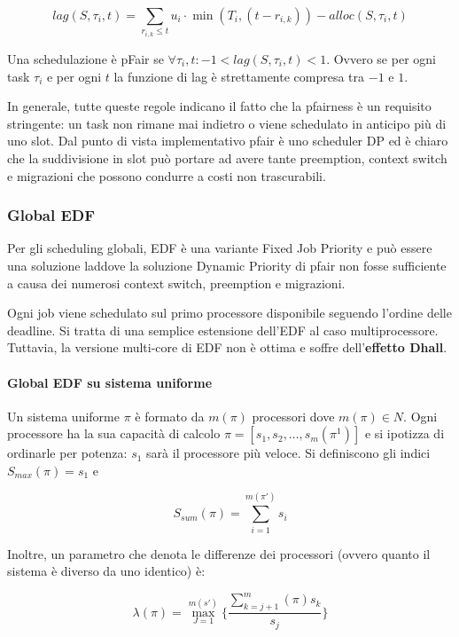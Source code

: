 \documentclass[11pt,a4paper]{report}
\begin{document}
\[ lag(S, \tau_i, t) = \sum_{r_{i,k} \le t} u_i \cdot \min(T_i, (t - r_{i,k})) - alloc(S, \tau_i, t) \]

Una schedulazione è pFair se $\forall \tau_i, t: -1 < lag(S, \tau_i, t) < 1$. Ovvero se per ogni task $\tau_i$ e per ogni $t$ la funzione di lag è strettamente compresa tra $-1$ e $1$.

In generale, tutte queste regole indicano il fatto che la pfairness è un requisito stringente: un task non rimane mai indietro o viene schedulato in anticipo più di uno slot.
Dal punto di vista implementativo pfair è uno scheduler DP ed è chiaro che la suddivisione in slot può portare ad avere tante preemption, context switch e migrazioni che possono condurre a costi non trascurabili.

\subsubsection{Global EDF}
Per gli scheduling globali, EDF è una variante Fixed Job Priority e può essere una soluzione laddove la soluzione Dynamic Priority di pfair non fosse sufficiente a causa dei numerosi context switch, preemption e migrazioni.

Ogni job viene schedulato sul primo processore disponibile seguendo l'ordine delle deadline. Si tratta di una semplice estensione dell'EDF al caso multiprocessore. Tuttavia, la versione multi-core di EDF non è ottima e soffre dell'\textbf{effetto Dhall}.

\paragraph{Global EDF su sistema uniforme}
Un sistema uniforme $\pi$ è formato da $m(\pi)$ processori dove $m(\pi) \in N$. Ogni processore ha la sua capacità di calcolo $\pi = [s_1, s_2, … , s_m(\pi^1)]$ e si ipotizza di ordinarle per potenza: $s_1$ sarà il processore più veloce. Si definiscono gli indici $S_{max}(\pi) = s_1$ e

\begin{equation}
    S_{sum}(\pi) = \sum_{i=1}^{m(\pi')}s_i
\end{equation}

Inoltre, un parametro che denota le differenze dei processori (ovvero quanto il sistema è diverso da uno identico) è:

\begin{equation}
    \lambda(\pi) = \max_{J=1}^{m(s')} \big\{\frac{\sum_{k=j+1}^m(\pi)s_k}{s_j}\big\}
\end{equation}
\end{document}
